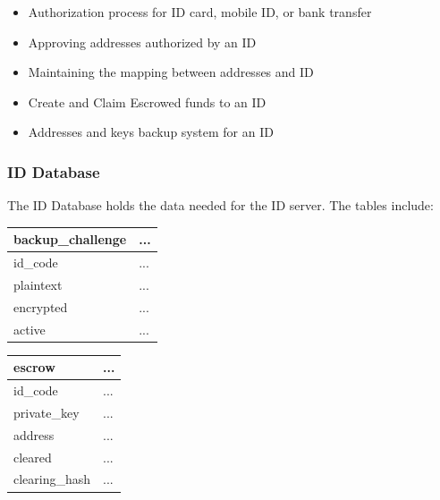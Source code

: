 \documentclass[a4paper,12pt]{article} %
\begin{document}
{\begin{itemize}
	\item Authorization process for ID card, mobile ID, or bank transfer
	\item Approving addresses authorized by an ID
	\item Maintaining the mapping between addresses and ID
	\item Create and Claim Escrowed funds to an ID
	\item Addresses and keys backup system for an ID
\end{itemize}

\subsubsection{ID Database} \label{sssec:3.5:idDatabase}

The ID Database holds the data needed for the ID server. The tables include:

\begin{center}
\begin{tabular}{ | l | p{10cm} | }
 \hline
 \textbf{backup\_challenge} & ...
 \\ \hline\hline
 id\_code & ...
 \\ \hline
 plaintext & ...
 \\ \hline
 encrypted & ...
 \\ \hline
 active & ...
 \\ \hline
\end{tabular}
\end{center}
\label{tab:idDatabaseBackupChallenge}

\begin{center}
\begin{tabular}{ | l | p{10cm} | }
 \hline
 \textbf{escrow} & ...
 \\ \hline\hline
 id\_code & ...
 \\ \hline
 private\_key & ...
 \\ \hline
 address & ...
 \\ \hline
 cleared & ...
 \\ \hline
 clearing\_hash & ...
 \\ \hline
\end{tabular}
\end{center}
\label{tab:idDatabaseEscrow}

}
\end{document}
